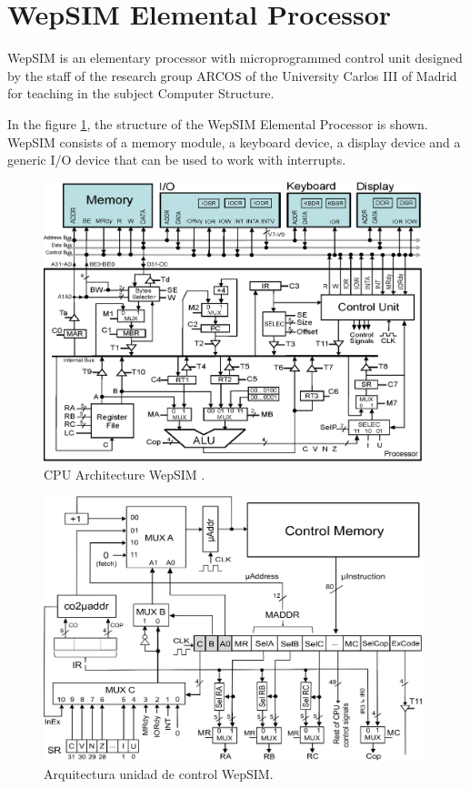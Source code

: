 \section{WepSIM Elemental Processor}

WepSIM is an elementary processor with microprogrammed control unit designed by the staff of the research group ARCOS of the University Carlos III of Madrid for teaching in the subject Computer Structure.

In the figure \ref{fig:wepsimCPU_figure_summary}, the structure of the WepSIM Elemental Processor is shown. WepSIM consists of a memory module, a keyboard device, a display device and a generic I/O device that can be used to work with interrupts.

\begin{figure}[htbp]
 	\centering
 	\includegraphics[width=11cm]{figures/processor6}
 	\caption{CPU Architecture WepSIM .}
	\label{fig:wepsimCPU_figure_summary}
\end{figure}

\begin{figure}[htbp]
 	\centering
 	\includegraphics[width=11cm]{figures/controlunit6}
 	\caption{Arquitectura unidad de control WepSIM.}
	\label{fig:wepsimCU_figure_summary}
\end{figure}


